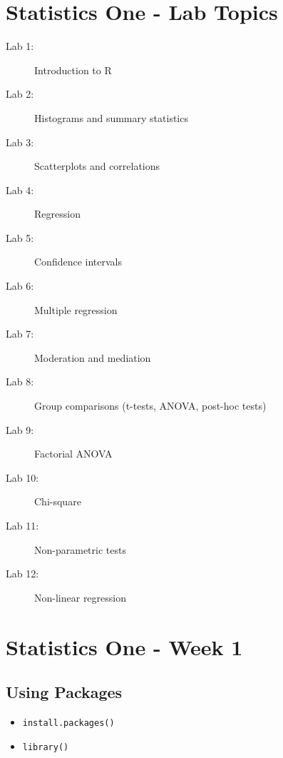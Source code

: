 \documentclass[11pt]{article} %
\begin{document}
 
\section{Statistics One - Lab Topics}

\begin{description}
\item[ Lab 1:] Introduction to R 

\item[ Lab 2:] Histograms and summary statistics           

\item[ Lab 3:] Scatterplots and correlations          

\item[ Lab 4:] Regression 

\item[ Lab 5:] Confidence intervals 

\item[ Lab 6:] Multiple regression 

\item[ Lab 7:] Moderation and mediation 

\item[ Lab 8:] Group comparisons (t-tests, ANOVA, post-hoc tests) 

\item[ Lab 9:] Factorial ANOVA 

\item[ Lab 10:] Chi-square 

\item[ Lab 11:] Non-parametric tests 

\item[ Lab 12:] Non-linear regression
\end{description}
\newpage
\section{Statistics One - Week 1}
\subsection{Using Packages}

\begin{itemize}
\item \texttt{install.packages()}
\item \texttt{library()}
\end{itemize}
\end{document}
